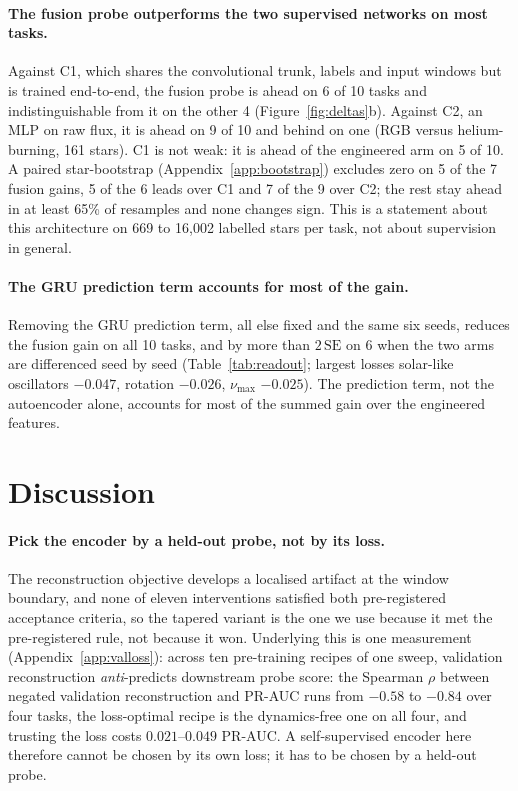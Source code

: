 \documentclass{article}
\begin{document}
\paragraph{The fusion probe outperforms the two supervised networks on most tasks.} Against C1, which shares
the convolutional trunk, labels and input windows but is trained end-to-end, the fusion
probe is ahead on 6 of 10 tasks and indistinguishable from it on the other 4
(Figure~\ref{fig:deltas}b). Against
C2, an MLP on raw flux, it is ahead on 9 of 10 and behind on one (RGB versus helium-burning, 161
stars). C1 is not weak: it is ahead of the engineered arm on 5 of 10.
A paired star-bootstrap (Appendix~\ref{app:bootstrap}) excludes zero on 5 of the 7 fusion gains, 5
of the 6 leads over C1 and 7 of the 9 over C2; the rest stay ahead in at least 65\% of resamples
and none changes sign.
This is a statement about this architecture on 669 to 16{,}002 labelled stars per task, not about
supervision in general.

\paragraph{The GRU prediction term accounts for most of the gain.} Removing the
GRU prediction term, all else fixed and the same six
seeds, reduces the fusion gain on all 10 tasks, and by more than $2\,\mathrm{SE}$ on 6 when the two
arms are differenced seed by seed (Table~\ref{tab:readout}; largest losses solar-like
oscillators $-0.047$, rotation $-0.026$, $\nu_{\max}$ $-0.025$). The prediction term, not the
autoencoder alone, accounts for most of the summed gain over the engineered features.

\section{Discussion}

\paragraph{Pick the encoder by a held-out probe, not by its loss.} The reconstruction objective develops a localised artifact at the
window boundary, and none of eleven interventions satisfied both pre-registered acceptance criteria,
so the tapered variant is the one we use because it met the pre-registered rule, not because it won. Underlying this is one
measurement (Appendix~\ref{app:valloss}): across ten pre-training recipes of one sweep, validation reconstruction \emph{anti}-predicts downstream probe score: the
Spearman $\rho$ between negated validation reconstruction and PR-AUC runs from $-0.58$ to $-0.84$ over
four tasks, the loss-optimal recipe is the dynamics-free one on all four, and trusting the loss costs
$0.021$--$0.049$ PR-AUC.
A self-supervised encoder here therefore cannot be chosen by its own loss; it has to be chosen by a
held-out probe.
\end{document}

